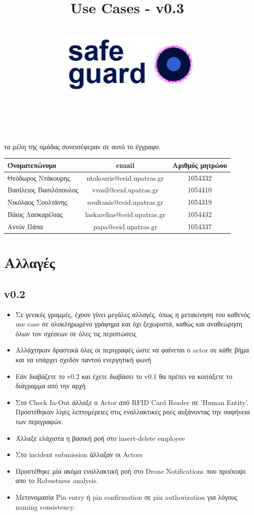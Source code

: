 \documentclass{article}
\title{Use Cases - v0.3}
\author{\\
\includegraphics[width=3in]{safeguard}\\[1ex]\\\\
}
\begin{document}
\maketitle

\newpage

 τα μέλη της ομάδας συνεισέφεραν σε αυτό το έγγραφο.\\

\begin{tabular}{|l|c|c|}
\hline
Όνοματεπώνυμο & email & Αριθμός μητρώου  \\
\hline
Θεόδωρος Ντάκουρης & ntakouris@ceid.upatras.gr & 1054332 \\
Βασίλειος Βασιλόπουλος & vvasil@ceid.upatras.gr &  1054410 \\
Νικόλαος Σουλτάνης & soultanis@ceid.upatras.gr & 1054319  \\
Βάιος Λασκαρέλιας & laskarelias@ceid.upatras.gr & 1054432 \\
Αντόν Πάπα & papa@ceid.upatras.gr & 1054337 \\
\hline
\end{tabular}

\renewcommand{\contentsname}{Περιεχόμενα}
\tableofcontents

\newpage

\section{Αλλαγές}
\subsection{v0.2}
\begin{itemize}
    \item Σε γενικές γραμμές, έχουν γίνει μεγάλες αλλαγές, όπως η μετακίνηση του καθενός use case σε ολοκληρωμένο γράφημα και όχι ξεχωριστά, καθώς και αναθεώρηση όλων τον σχέσεων σε όλες τις περιπτώσεις
    \item Αλλάχτηκαν δραστικά όλες οι περιγραφές ώστε να φαίνεται ο actor σε κάθε βήμα και να υπάρχει σχεδόν παντού ενεργητική φωνή
    \item Εάν διαβάζετε το v0.2 και έχετε διαβάσει το v0.1 θα πρέπει να κοιτάξετε το διάγραμμα από την αρχή
    \item Στο Check In-Out άλλαξε ο Actor από RFID Card Reader σε 'Human Entity'. Προστέθηκαν λίγες λεπτομέρειες στις εναλλακτικές ροές αυξάνοντας την σαφήνεια των περιγραφών.
    \item Άλλαξε ελάχιστα η βασική ροή στο insert-delete employee
    \item Στο incident submission άλλαξαν οι Actors 
    \item Προστέθηκε μία ακόμα εναλλακτική ροή στο Drone Notifications που προέκυψε απο το Robustness analysis.
    \hline 
    \item Μετονομασία Pin entry ή pin confirmation σε pin authorization για λόγους naming consistency.
\end{itemize}
\end{document}
